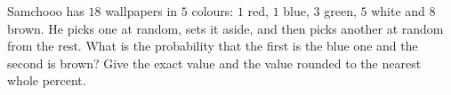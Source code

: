 Samchooo has $18$ wallpapers in $5$ colours: $1$ red, $1$ blue, $3$ green, $5$ white and $8$ brown. He picks one at random, sets it aside, and then picks another at random from the rest. What is the probability that the first is the blue one and the second is brown? Give the exact value and the value rounded to the nearest whole percent.

